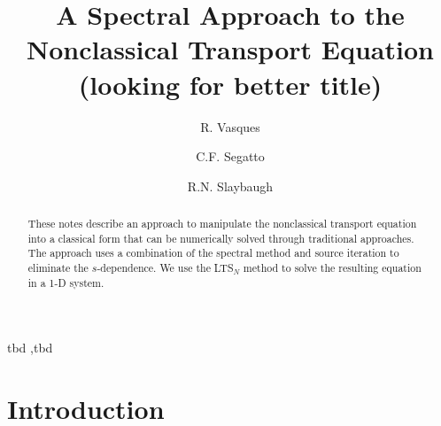 \documentclass[preprint,12pt]{elsarticle}
\begin{document}
\begin{frontmatter}

\title{A Spectral Approach to the Nonclassical Transport Equation\\
(looking for better title)}

\author[ucb]{R. Vasques}
\author[ufrgs]{C.F. Segatto }
\author[ucb]{R.N. Slaybaugh}

\address[ucb]{University of California, Berkeley, Department of Nuclear Engineering, 4155 Etcheverry Hall \\ Berkeley, CA 94720-1730}
\address[ufrgs]{UFRGS - Federal University of Rio Grande do Sul, Av. Osvaldo Aranha 99, 90046-900\\ Porto Alegre, RS, Brazil}


\begin{abstract}

These notes describe an approach to manipulate the nonclassical transport equation into a classical form that can be numerically solved through traditional approaches. 
The approach uses a combination of the spectral method and source iteration to eliminate the $s$-dependence.
We use the LTS$_N$ method to solve the resulting equation in a 1-D system. 
 
\end{abstract}

\begin{keyword}
tbd \sep tbd 
\end{keyword}

\end{frontmatter}

\section{Introduction}\label{sec1}
\setcounter{section}{1}
\setcounter{equation}{0} 
\end{document}
